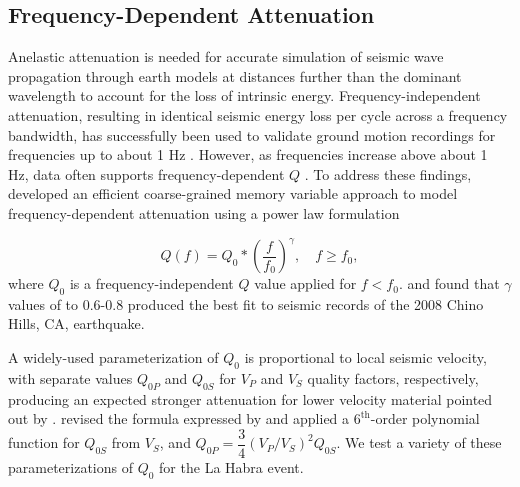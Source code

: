 \subsection{Frequency-Dependent Attenuation}
Anelastic attenuation is needed for accurate simulation of seismic wave propagation through earth models at distances further than the dominant wavelength to account for the loss of intrinsic energy. Frequency-independent attenuation, resulting in identical seismic energy loss per cycle across a frequency bandwidth, has successfully been used to validate ground motion recordings for frequencies up to about 1 Hz . However, as frequencies increase above about 1 Hz, data often supports frequency-dependent $Q$ . To address these findings, \citet{withersMemoryEfficientSimulation2015} developed an efficient coarse-grained memory variable approach to model frequency-dependent attenuation using a power law formulation

\begin{equation}\label{eq:highf-3}
  Q(f)=Q_{0} *\left(\dfrac{f}{f_{0}}\right)^{\gamma}, \quad f \geq f_{0},
\end{equation}
\noindent where $Q_0$ is a frequency-independent $Q$ value applied for $f<f_{0}$.  \citet{withersMemoryEfficientSimulation2015} and \citet{savranGroundMotionSimulation2019} found that $\gamma$ values of to 0.6-0.8 produced the best fit to seismic records of the 2008 Chino Hills, CA, earthquake.

A widely-used parameterization of $Q_0$ is proportional to local seismic velocity, with separate values $Q_{0P}$ and $Q_{0S}$ for $V_P$ and $V_S$ quality factors, respectively, producing an expected stronger attenuation for lower velocity material pointed out by \citet{haukssonAttenuationModelsThree2006}. \citet{taborda2014ground} revised the formula expressed by \citet{brocher2008compressional} and applied a $6^{\text{th}}$-order polynomial function for $Q_{0S}$ from $V_S$, and $Q_{0P}=\dfrac{3}{4}\left(V_P/V_S\right)^2Q_{0S}$. We test a variety of these parameterizations of $Q_0$ for the La Habra event.

